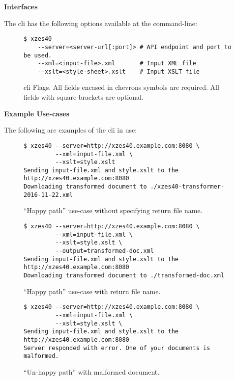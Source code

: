 \textbf{Interfaces}

The \gls{cli} has the following options available at the command-line:
\begin{figure}[H]
    \begin{lstlisting}
$ xzes40
    --server=<server-url[:port]> # API endpoint and port to be used.
    --xml=<input-file>.xml       # Input XML file
    --xslt=<style-sheet>.xslt    # Input XSLT file
    \end{lstlisting}
    \caption{\gls{cli} Flags. All fields encased in chevrons symbols are required. All fields with square brackets are optional.}
\end{figure}

\textbf{Example Use-cases}

The following are examples of the \gls{cli} in use:

\begin{figure}[H]
    \begin{lstlisting}[caption={}]
$ xzes40 --server=http://xzes40.example.com:8080 \
         --xml=input-file.xml \
         --xslt=style.xslt
Sending input-file.xml and style.xslt to the http://xzes40.example.com:8080
Downloading transformed document to ./xzes40-transformer-2016-11-22.xml
    \end{lstlisting}
    \caption{``Happy path'' use-case without specifying return file name.}
\end{figure}


\begin{figure}[H]
   \begin{lstlisting}
$ xzes40 --server=http://xzes40.example.com:8080 \
         --xml=input-file.xml \
         --xslt=style.xslt \
         --output=transformed-doc.xml
Sending input-file.xml and style.xslt to the http://xzes40.example.com:8080
Downloading transformed document to ./transformed-doc.xml
   \end{lstlisting}
   \caption{``Happy path'' use-case with return file name.}
\end{figure}

\begin{figure}[H]
    \begin{lstlisting}
$ xzes40 --server=http://xzes40.example.com:8080 \
         --xml=input-file.xml \
         --xslt=style.xslt \
Sending input-file.xml and style.xslt to the http://xzes40.example.com:8080
Server responded with error. One of your documents is malformed.
    \end{lstlisting}
    \caption{``Un-happy path'' with malformed document.}
\end{figure}


